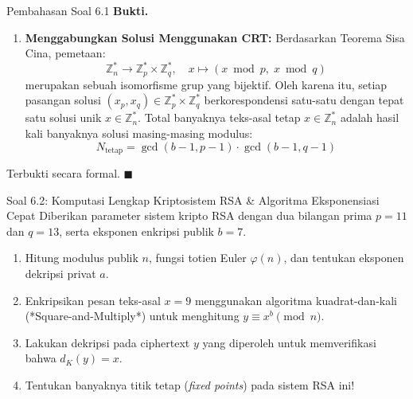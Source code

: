 \documentclass[11pt,a4paper]{article}
\newenvironment{proof}{\noindent\textbf{Bukti.}}{\hfill$\blacksquare$\vspace{0.3em}}
\begin{document}
\begin{solusibox}{Pembahasan Soal 6.1}
\begin{proof}
\begin{enumerate}[leftmargin=*]
    Dengan penalaran yang persis sama pada grup siklis $\mathbb{Z}_q^*$ yang berorde $q - 1$, banyaknya solusi $x \in \mathbb{Z}_q^*$ yang memenuhi $x^{b-1} \equiv 1 \pmod q$ adalah tepat:
    \[
    \gcd(b - 1, q - 1)
    \]
    \item \textbf{Menggabungkan Solusi Menggunakan CRT:}
    Berdasarkan Teorema Sisa Cina, pemetaan:
    \[
    \mathbb{Z}_n^* \to \mathbb{Z}_p^* \times \mathbb{Z}_q^*, \quad x \mapsto (x \bmod p, \; x \bmod q)
    \]
    merupakan sebuah isomorfisme grup yang bijektif.
    Oleh karena itu, setiap pasangan solusi $(x_p, x_q) \in \mathbb{Z}_p^* \times \mathbb{Z}_q^*$ berkorespondensi satu-satu dengan tepat satu solusi unik $x \in \mathbb{Z}_n^*$.
    Total banyaknya teks-asal tetap $x \in \mathbb{Z}_n^*$ adalah hasil kali banyaknya solusi masing-masing modulus:
    \[
    N_{\text{tetap}} = \gcd(b - 1, p - 1) \cdot \gcd(b - 1, q - 1)
    \]
\end{enumerate}
Terbukti secara formal.
\end{proof}
\end{solusibox}

\vspace{0.4cm}

\begin{soalbox}{Soal 6.2: Komputasi Lengkap Kriptosistem RSA \& Algoritma Eksponensiasi Cepat}
Diberikan parameter sistem kripto RSA dengan dua bilangan prima $p = 11$ dan $q = 13$, serta eksponen enkripsi publik $b = 7$.
\begin{enumerate}[label=(\alph*)]
    \item Hitung modulus publik $n$, fungsi totien Euler $\varphi(n)$, dan tentukan eksponen dekripsi privat $a$.
    \item Enkripsikan pesan teks-asal $x = 9$ menggunakan algoritma kuadrat-dan-kali (*Square-and-Multiply*) untuk menghitung $y \equiv x^b \pmod n$.
    \item Lakukan dekripsi pada ciphertext $y$ yang diperoleh untuk memverifikasi bahwa $d_K(y) = x$.
    \item Tentukan banyaknya titik tetap (\textit{fixed points}) pada sistem RSA ini!
\end{enumerate}
\end{soalbox}
\end{document}
